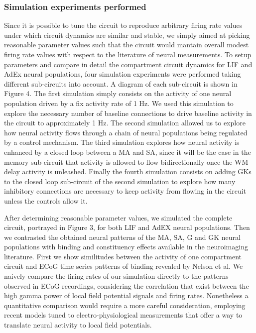 \documentclass[10pt]{article}
\begin{document}
\subsubsection{Simulation experiments
performed}\label{simulation-experiments-performed}

Since it is possible to tune the circuit to reproduce arbitrary firing
rate values under which circuit dynamics are similar and stable, we
simply aimed at picking reasonable parameter values such that the
circuit would mantain overall modest firing rate values with respect to
the literature of neural measurements. To setup parameters and compare
in detail the compartment circuit dynamics for LIF and AdEx neural
populations, four simulation experiments were performed taking different
sub-circuits into account. A diagram of each sub-circuit is shown in
Figure 4. The first simulation simply consists on the activity of one
neural population driven by a fix activity rate of 1 Hz. We used this
simulation to explore the necessary number of baseline connections to
drive baseline activity in the circuit to approximately 1 Hz. The second
simulation allowed us to explore how neural activity flows through a
chain of neural populations being regulated by a control mechanism. The
third simulation explores how neural activity is enhanced by a closed
loop between a MA and SA, since it will be the case in the memory
sub-circuit that activity is allowed to flow bidirectionally once the WM
delay activity is unleashed. Finally the fourth simulation consists on
adding GKs to the closed loop sub-circuit of the second simulation to
explore how many inhibitory connections are necessary to keep activity
from flowing in the circuit unless the controls allow it.

After determining reasonable parameter values, we simulated the complete
circuit, portrayed in Figure 3, for both LIF and AdEX neural
populations. Then we contrasted the obtained neural patterns of the MA,
SA, G and GK neural populations with binding and constituency effects
available in the neuroimaging literature. First we show similitudes
between the activity of one compartment circuit and ECoG time series
patterns of binding revealed by Nelson et al\cite{Nelson_2017}. We
naively compare the firing rates of our simulation directly to the
patterns observed in ECoG recordings, considering the correlation that
exist between the high gamma power of local field potential signals and
firing rates\cite{Ray_2011,Manning_2009}. Nonetheless a quantitative comparison
would require a more careful consideration, employing recent models
tuned to electro-physiological measurements that offer a way to
translate neural activity to local field potentials\cite{Mazzoni_2015,Hagen_2015}.
\end{document}
